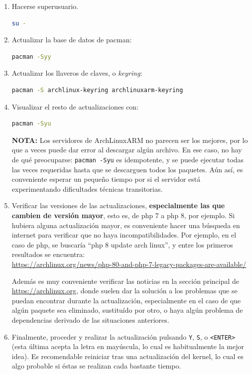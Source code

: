\begin{enumerate}
    \item Hacerse superusuario.
\begin{lstlisting}[language=bash]
su -
\end{lstlisting}
    \item Actualizar la base de datos de pacman:
\begin{lstlisting}[language=bash]
pacman -Syy
\end{lstlisting}
    \item Actualizar los llaveros de claves, o \textit{keyring}:
\begin{lstlisting}[language=bash]
pacman -S archlinux-keyring archlinuxarm-keyring
\end{lstlisting}
    \item Visualizar el resto de actualizaciones con:
\begin{lstlisting}[language=bash]
pacman -Syu
\end{lstlisting}
    \textbf{NOTA:} Los servidores de ArchLinuxARM no parecen ser los mejores, por lo que a veces puede dar error al descargar algún archivo. En ese caso, no hay de qué preocuparse: \texttt{pacman -Syu} es idempotente, y se puede ejecutar todas las veces requeridas hasta que se descarguen todos los paquetes. Aún así, es conveniente esperar un pequeño tiempo por si el servidor está experimentando dificultades técnicas transitorias.
    
    \item Verificar las versiones de las actualizaciones, \textbf{especialmente las que cambien de versión mayor}, esto es, de php 7 a php 8, por ejemplo. Si hubiera alguna actualización mayor, es conveniente hacer una búsqueda en internet para verificar que no haya incompatibilidades.
    Por ejemplo, en el caso de php, se buscaría ``php 8 update arch linux'', y entre los primeros resultados se encuentra: \\\footnotesize\url{https://archlinux.org/news/php-80-and-php-7-legacy-packages-are-available/}\normalsize

    Además es muy conveniente verificar las noticias en la sección principal de \url{https://archlinux.org}, donde suelen dar la solución a los problemas que se puedan encontrar durante la actualización, especialmente en el caso de que algún paquete sea eliminado, sustituído por otro, o haya algún problema de dependencias derivado de las situaciones anteriores.

    \item Finalmente, proceder y realizar la actualización pulsando \texttt{Y}, \texttt{S}, o \texttt{<ENTER>} (esta última acepta la letra en mayúscula, lo cual es habitualmente la mejor idea). Es recomendable reiniciar tras una actualización del kernel, lo cual es algo probable si éstas se realizan cada bastante tiempo.
\end{enumerate}

